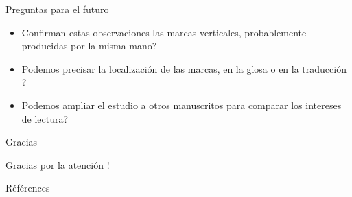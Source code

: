 \documentclass[11pt,aspectratio=169]{beamer}
\begin{document}
\begin{frame}{Preguntas para el futuro}
\begin{center}
\begin{itemize}
\item Confirman estas observaciones las marcas verticales, probablemente producidas por la misma mano? 
\item Podemos precisar la localización de las marcas, en la glosa o en la traducción ?
\item Podemos ampliar el estudio a otros manuscritos para comparar los intereses de lectura?
\end{itemize}
\end{center}
\end{frame}


\begin{frame}{Gracias}
\begin{center}
Gracias por la atención !
\end{center}
\end{frame}



\begin{frame}[allowframebreaks]{Références}
\printbibliography
\end{frame}
\end{document}
